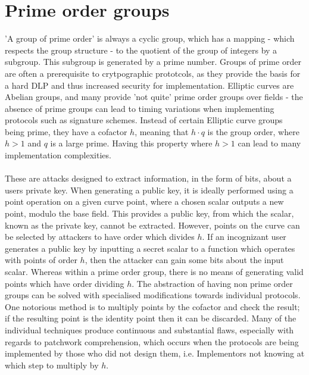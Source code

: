 \documentclass{article}
\begin{document}
\section{Prime order groups}
'A group of prime order' is always a cyclic group,  which has a mapping - which respects the group structure - to the quotient of the group of integers by a subgroup. This subgroup is generated by a prime number. Groups of prime order are often a prerequisite to crytpographic prototcols, as they provide the basis for a hard DLP and thus increased security for implementation. Elliptic curves are Abelian groups, and many provide 'not quite' prime order groups over fields - the absence of prime groups can lead to timing variations when implementing protocols such as signature schemes. Instead of certain Elliptic curve groups being prime, they have a cofactor $h$, meaning that $h \cdot q$ is the group order, where $h > 1$ and $q$ is a large prime. Having this property where $h > 1$ can lead to many implementation complexities.\\\\
These are attacks designed to extract information, in the form of bits, about a users private key. When generating a public key, it is ideally performed using a point operation on a given curve point, where a chosen scalar outputs a new point, modulo the base field. This provides a public key, from which the scalar, known as the private key, cannot be extracted. However, points on the curve can be selected by attackers to have order which divides $h$. If an incognizant user generates a public key by inputting a secret scalar to a function which operates with points of order $h$, then the attacker can gain some bits about the input scalar. Whereas within a prime order group, there is no means of generating valid points which have order dividing $h$. The abstraction of having non prime order groups can be solved with specialised modifications towards individual protocols. One notorious method is to multiply points by the cofactor and check the result; if the resulting point is the identity point then it can be discarded. Many of the individual techniques produce continuous and substantial flaws, especially with regards to patchwork comprehension, which occurs when the protocols are being implemented by those who did not design them, i.e. Implementors not knowing at which step to multiply by $h$. 
\end{document}
